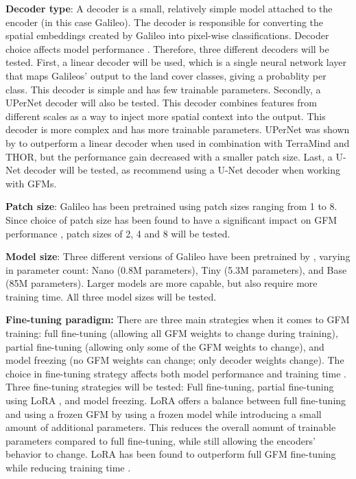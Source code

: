 \documentclass[a4paper,12pt]{article}
\begin{document}
\textbf{Decoder type}: A decoder is a small, relatively simple model attached to the encoder (in this case Galileo). The decoder is responsible for converting the spatial embeddings created by Galileo into pixel-wise classifications. Decoder choice affects model performance \citep{schindleggerNowWeKnow2026,escofetFinetuneSmarterNot2025}. Therefore, three different decoders will be tested. First, a linear decoder will be used, which is a single neural network layer that maps Galileos' output to the land cover classes, giving a probablity per class. This decoder is simple and has few trainable parameters. Secondly, a UPerNet decoder \citep{xiaoUnifiedPerceptualParsing2018} will also be tested. This decoder combines features from different scales as a way to inject more spatial context into the output. This decoder is more complex and has more trainable parameters. UPerNet was shown by \citet{schindleggerNowWeKnow2026} to outperform a linear decoder when used in combination with TerraMind and THOR, but the performance gain decreased with a smaller patch size. Last, a U-Net \citep{ronnebergerUNetConvolutionalNetworks2015} decoder will be tested, as \citet{escofetFinetuneSmarterNot2025} recommend using a U-Net decoder when working with \ac{GFM}s.

\textbf{Patch size}: Galileo has been pretrained using patch sizes ranging from 1 to 8. Since choice of patch size has been found to have a significant impact on \ac{GFM} performance \citep{schindleggerNowWeKnow2026}, patch sizes of 2, 4 and 8 will be tested.

\textbf{Model size}: Three different versions of Galileo have been pretrained by \citet{tsengGalileoLearningGlobal2025}, varying in parameter count: Nano (0.8M parameters), Tiny (5.3M parameters), and Base (85M parameters). Larger models are more capable, but also require more training time. All three model sizes will be tested.

\textbf{Fine-tuning paradigm:} There are three main strategies when it comes to \ac{GFM} training: full fine-tuning (allowing all \ac{GFM} weights to change during training), partial fine-tuning (allowing only some of the \ac{GFM} weights to change), and model freezing (no \ac{GFM} weights can change; only decoder weights change). The choice in fine-tuning strategy affects both model performance and training time \citep{escofetFinetuneSmarterNot2025}. Three fine-tuning strategies will be tested: Full fine-tuning, partial fine-tuning using LoRA \citep{escofetFinetuneSmarterNot2025}, and model freezing. LoRA offers a balance between full fine-tuning and using a frozen GFM by using a frozen model while introducing a small amount of additional parameters. This reduces the overall aomunt of trainable parameters compared to full fine-tuning, while still allowing the encoders' behavior to change. LoRA has been found to outperform full GFM fine-tuning while reducing training time \citep{escofetFinetuneSmarterNot2025}.
\end{document}
